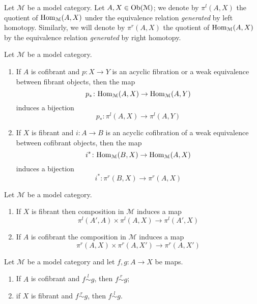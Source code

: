 \begin{refsection}
\begin{defin}
Let $\mathcal M$ be a model category. Let $A,X \in \operatorname{Ob}(\mathcal M)$; we denote by $\pi^l(A,X)$ the quotient of $\mathrm{Hom}_{\mathcal M}(A,X)$ under the equivalence relation \emph{generated} by left homotopy. Similarly, we will denote by $\pi^r(A,X)$ the quotient of $\mathrm{Hom}_{\mathcal M}(A,X)$ by the equivalence relation \emph{generated} by right homotopy.
\end{defin}

\begin{lemma} \label{lemma homotopy category 2}
Let $\mathcal M$ be a model category.
\begin{enumerate}
\item If $A$ is cofibrant and $p \colon X \to Y$ is an acyclic fibration or a weak equivalence between fibrant objects, then the map
\[
p_* \colon \mathrm{Hom}_{\mathcal M}(A,X) \to \mathrm{Hom}_{\mathcal M}(A,Y)
\]
induces a bijection
\[
p_* \colon \pi^l(A,X) \to \pi^l(A,Y)
\]
\item If $X$ is fibrant and $i \colon A \to B$ is an acyclic cofibration of a weak equivalence between cofibrant objects, then the map
\[
i^* \colon \mathrm{Hom}_{\mathcal M}(B,X) \to \mathrm{Hom}_{\mathcal M}(A,X)
\]
induces a bijection
\[
i^* \colon \pi^r(B,X) \to \pi^r(A,X)
\]
\end{enumerate}
\end{lemma}

\begin{lemma} \label{lemma hom homotopy category}
Let $\mathcal M$ be a model category.
\begin{enumerate}
\item If $X$ is fibrant then composition in $\mathcal M$ induces a map
\[
\pi^l(A',A) \times \pi^l(A,X) \to \pi^l(A',X)
\]
\item If $A$ is cofibrant the composition in $\mathcal M$ induces a map
\[
\pi^r(A,X) \times \pi^r(A,X') \to \pi^r(A,X')
\]
\end{enumerate}
\end{lemma}

\begin{lemma}
Let $\mathcal M$ be a model category and let $f,g \colon A \to X$ be maps.
\begin{enumerate}
\item If $A$ is cofibrant and $f \stackrel{l}{\sim} g$, then $f \stackrel{r}{\sim} g$;
\item if $X$ is fibrant and $f \stackrel{r}{\sim} g$, then $f \stackrel{l}{\sim} g$.
\end{enumerate}
\end{lemma}


\end{refsection}

